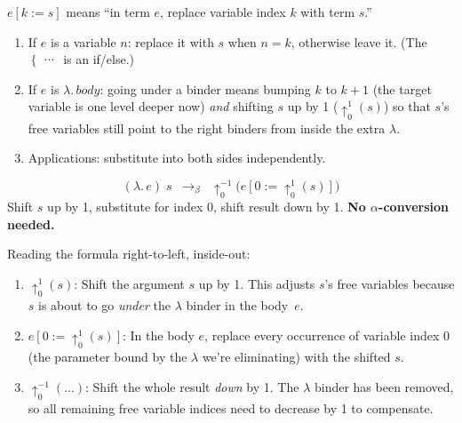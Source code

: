\documentclass[11pt,a4paper]{article}
\theoremstyle{definition}
\newcommand{\lam}{\lambda}
\newcommand{\reduce}{\longrightarrow_\beta}
\begin{document}
\begin{intuition}
$e[k := s]$ means ``in term $e$, replace variable index $k$ with term $s$.''
\begin{enumerate}[leftmargin=2em]
\item If $e$ is a variable $n$: replace it with $s$ when $n = k$, otherwise leave it.
  (The $\begin{cases}\cdots\end{cases}$ is an if/else.)
\item If $e$ is $\lam.\,\mathit{body}$: going under a binder means bumping $k$
  to $k{+}1$ (the target variable is one level deeper now) \emph{and} shifting $s$
  up by 1 ($\uparrow^1_0(s)$) so that $s$'s free variables still point to the right
  binders from inside the extra $\lam$.
\item Applications: substitute into both sides independently.
\end{enumerate}
\end{intuition}

\begin{defnbox}
\[
  \boxed{\;(\lam.\, e)\; s \;\;\reduce\;\; \uparrow^{-1}_0\bigl(e[0 := \uparrow^1_0(s)]\bigr)\;}
\]
Shift $s$ up by 1, substitute for index 0, shift result down by 1. \textbf{No $\alpha$-conversion needed.}
\end{defnbox}

\begin{intuition}
Reading the formula right-to-left, inside-out:
\begin{enumerate}[leftmargin=2em]
\item $\uparrow^1_0(s)$: Shift the argument $s$ up by 1. This adjusts $s$'s
  free variables because $s$ is about to go \emph{under} the $\lam$ binder in
  the body~$e$.
\item $e[0 := \uparrow^1_0(s)]$: In the body $e$, replace every occurrence of
  variable index 0 (the parameter bound by the $\lam$ we're eliminating) with
  the shifted $s$.
\item $\uparrow^{-1}_0(\ldots)$: Shift the whole result \emph{down} by 1.
  The $\lam$ binder has been removed, so all remaining free variable indices
  need to decrease by 1 to compensate.
\end{enumerate}
\end{intuition}
\end{document}
